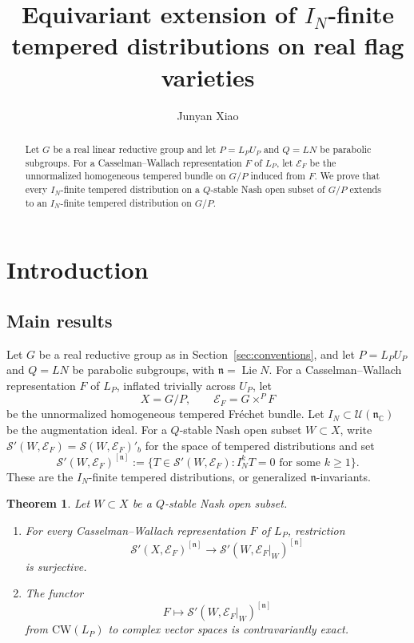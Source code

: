 \documentclass[a4paper,12pt]{amsart}
\title[Equivariant extension on real flag varieties]
{Equivariant extension of $I_N$-finite tempered distributions on real flag varieties}
\author[J.Y.~Xiao]{Junyan Xiao}
\date{}
\numberwithin{equation}{section}
\newtheorem{maintheorem}{Theorem}
\theoremstyle{definition}
\theoremstyle{remark}
\newcommand{\C}{\mathbb C}
\newcommand{\fn}{\mathfrak n}
\newcommand{\IN}{I_N}
\newcommand{\mcU}{\mathcal U}
\newcommand{\mcS}{\mathcal S}
\newcommand{\mcE}{\mathcal E}
\newcommand{\Lie}{\operatorname{Lie}}
\begin{document}
\begin{abstract}
Let $G$ be a real linear reductive group and let $P=L_PU_P$ and $Q=LN$ be parabolic subgroups. For a Casselman--Wallach representation $F$ of $L_P$, let $\mcE_F$ be the unnormalized homogeneous tempered bundle on $G/P$ induced from $F$. We prove that every $I_N$-finite tempered distribution on a $Q$-stable Nash open subset of $G/P$ extends to an $I_N$-finite tempered distribution on $G/P$.
\end{abstract}

\maketitle
\tableofcontents

\section{Introduction}\label{sec:intro}

\subsection{Main results}\label{ssec:result}

Let $G$ be a real reductive group as in Section~\ref{sec:conventions}, and let $P=L_PU_P$ and $Q=LN$ be parabolic subgroups, with $\fn=\Lie N$. For a Casselman--Wallach representation $F$ of $L_P$, inflated trivially across $U_P$, let
\[
 X=G/P,\qquad \mcE_F=G\times^P F
\]
be the unnormalized homogeneous tempered Fr\'echet bundle. Let $\IN\subset\mcU(\fn_\C)$ be the augmentation ideal. For a $Q$-stable Nash open subset $W\subset X$, write $\mcS'(W,\mcE_F)=\mcS(W,\mcE_F)'_b$ for the space of tempered distributions and set
\[
 \mcS'(W,\mcE_F)^{[\fn]}
 :=\{T\in\mcS'(W,\mcE_F):\IN^kT=0\text{ for some }k\ge1\}.
\]
These are the $\IN$-finite tempered distributions, or generalized $\fn$-invariants.

\begin{maintheorem}\label{thm:general-extension}
Let $W\subset X$ be a $Q$-stable Nash open subset.
\begin{enumerate}[label=\textup{(\roman*)}]
\item For every Casselman--Wallach representation $F$ of $L_P$, restriction
\[
 \mcS'(X,\mcE_F)^{[\fn]}
 \longrightarrow\mcS'(W,\mcE_F|_W)^{[\fn]}
\]
is surjective.
\item The functor
\[
 F\longmapsto\mcS'(W,\mcE_F|_W)^{[\fn]}
\]
from $\mathrm{CW}(L_P)$ to complex vector spaces is contravariantly exact.
\end{enumerate}
\end{maintheorem}
\end{document}
